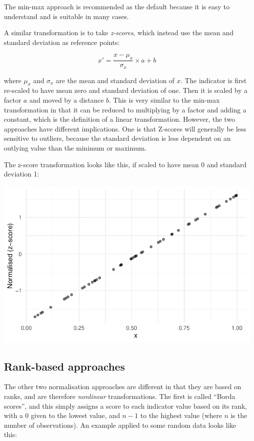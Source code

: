 \documentclass[
  letterpaper,
  DIV=11,
  numbers=noendperiod]{scrreprt}
\begin{document}
The min-max approach is recommended as the default because it is easy to
understand and is suitable in many cases.

A similar transformation is to take \emph{z-scores}, which instead use
the mean and standard deviation as reference points:

\[ x' = \frac{ x - \mu_x }{ \sigma_x } \times a + b\]

where \(\mu_x\) and \(\sigma_x\) are the mean and standard deviation of
\(x\). The indicator is first re-scaled to have mean zero and standard
deviation of one. Then it is scaled by a factor \(a\) and moved by a
distance \(b\). This is very similar to the min-max transformation in
that it can be reduced to multiplying by a factor and adding a constant,
which is the definition of a linear transformation. However, the two
approaches have different implications. One is that Z-scores will
generally be less sensitive to outliers, because the standard deviation
is less dependent on an outlying value than the minimum or maximum.

The z-score transformation looks like this, if scaled to have mean 0 and
standard deviation 1:

\includegraphics{normalisation_files/figure-pdf/unnamed-chunk-2-1.pdf}

\hypertarget{rank-based-approaches}{%
\subsection{Rank-based approaches}\label{rank-based-approaches}}

The other two normalisation approaches are different in that they are
based on ranks, and are therefore \emph{nonlinear} transformations. The
first is called ``Borda scores'', and this simply assigns a score to
each indicator value based on its rank, with a 0 given to the lowest
value, and \(n-1\) to the highest value (where \(n\) is the number of
observations). An example applied to some random data looks like this:
\end{document}
